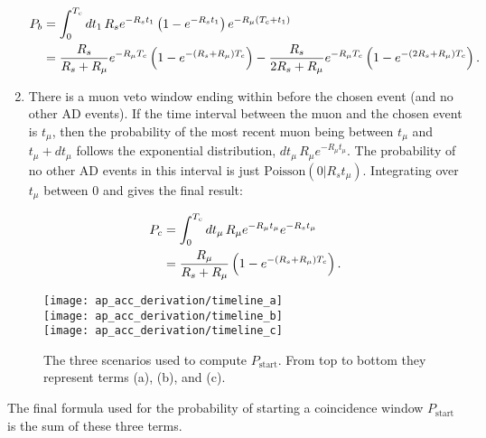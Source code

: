\begin{enumerate}
        \begin{align*}
            P_b &= \int_0^{T_c} dt_1\,R_se^{-R_st_1}
            \left(
                1 - e^{-R_s t_1}
            \right)
            e^{-R_\mu(T_c+t_1)} \\
                &= \frac{R_s}{R_s+R_\mu} e^{-R_\mu T_c}
                \left(
                    1 - e^{-(R_s + R_\mu)T_c}
                \right)
                - \frac{R_s}{2R_s + R_\mu} e^{-R_\mu T_c}
                \left(
                    1 - e^{-(2R_s + R_\mu)T_c}
                \right).
        \end{align*}
    \item There is a muon veto window ending within \tc{}
        before the chosen event (and no other AD events).
        If the time interval between the muon and the chosen event is $t_\mu$,
        then the probability of the most recent muon being between
        $t_\mu$ and $t_\mu + dt_\mu$ follows the exponential distribution,
        $dt_\mu\,R_\mu e^{-R_\mu t_\mu}$.
        The probability of no other AD events in this interval is just
        $\text{Poisson}(0\vert R_s t_\mu)$.
        Integrating over $t_\mu$ between $0$ and \tc{} gives the final result:

        \begin{align*}
            P_c &= \int_0^{T_c} dt_\mu\,R_\mu e^{-R_\mu t_\mu} e^{-R_s t_\mu} \\
                &= \frac{R_\mu}{R_s + R_\mu}
                \left(
                    1 - e^{-(R_s + R_\mu)T_c}
                \right).
        \end{align*}

\end{enumerate}

\begin{figure}
    \centering
    \texttt{[image: ap\_acc\_derivation/timeline\_a]} \\
    \texttt{[image: ap\_acc\_derivation/timeline\_b]} \\
    \texttt{[image: ap\_acc\_derivation/timeline\_c]}
    \caption[Diagrams for computing coincidence probabilities]{
        The three scenarios used to compute $P_{\text{start}}$.
        From top to bottom they represent terms (a), (b), and (c).
    }
    \label{fig:ap_scenarios}
\end{figure}
The final formula used for the probability of starting a coincidence window
$P_{\text{start}}$ is the sum of these three terms.

